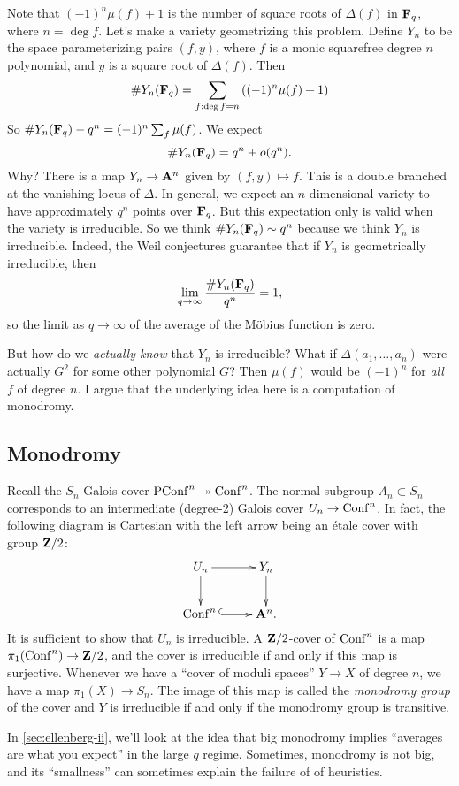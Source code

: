 Note that $(-1)^n\mu(f)+1$ is the number of square roots of $\Delta(f)$ in 
$\mathbf{F}_q$, where $n=\deg f$. Let's make a variety geometrizing this problem. 
Define $Y_n$ to be the space parameterizing pairs $(f,y)$, where $f$ is a monic 
squarefree degree $n$ polynomial, and $y$ is a square root of $\Delta(f)$. Then 
\[
  \#Y_n(\mathbf{F}_q) = \sum_{f:\deg f=n} \left((-1)^n \mu(f) + 1\right)
\]
So $\#Y_n(\mathbf{F}_q) - q^n = (-1)^n \sum_f \mu(f)$. We expect 
\[
  \# Y_n(\mathbf{F}_q) = q^n + o(q^n) .
\]
Why? There is a map $Y_n\to \mathbf{A}^n$ given by $(f,y)\mapsto f$. This is a 
double branched at the vanishing locus of $\Delta$. In general, we expect an 
$n$-dimensional variety to have approximately $q^n$ points over $\mathbf{F}_q$. But 
this expectation only is valid when the variety is irreducible. So we think 
$\# Y_n(\mathbf{F}_q)\sim q^n$ because we think $Y_n$ is irreducible. Indeed, the 
Weil conjectures guarantee that if $Y_n$ is geometrically irreducible, then 
\[
  \lim_{q\to \infty} \frac{\#Y_n(\mathbf{F}_q)}{q^n} = 1 ,
\]
so the limit as $q\to \infty$ of the average of the M\"obius function is zero. 

But how do we \emph{actually know} that $Y_n$ is irreducible? What if 
$\Delta(a_1,\dots,a_n)$ were actually $G^2$ for some other polynomial $G$? 
Then $\mu(f)$ would be $(-1)^n$ for \emph{all} $f$ of degree $n$. I argue that 
the underlying idea here is a computation of monodromy. 





\subsection{Monodromy}

Recall the $S_n$-Galois cover 
$\operatorname{PConf}^n \twoheadrightarrow \operatorname{Conf}^n$. The normal subgroup 
$A_n\subset S_n$ corresponds to an intermediate (degree-2) Galois cover 
$U_n\to \operatorname{Conf}^n$. In fact, the following diagram is Cartesian with 
the left arrow being an \'etale cover with group $\mathbf{Z}/2$:
\[\xymatrix{
  U_n \ar[r] \ar[d] 
    & Y_n \ar[d] \\
  \configuration^n{} \ar@{^{(}->}[r] 
    & \dA^n .
}\]
It is sufficient to show that $U_n$ is irreducible. A $\mathbf{Z}/2$-cover of 
$\operatorname{Conf}^n$ is a map $\pi_1(\operatorname{Conf}^n)\to \mathbf{Z}/2$, and the cover 
is irreducible if and only if this map is surjective. Whenever we have a 
``cover of moduli spaces'' $Y\to X$ of degree $n$, we have a map 
$\pi_1(X)\to S_n$. The image of this map is called the \emph{monodromy group} 
of the cover and $Y$ is irreducible if and only if the monodromy group is 
transitive. 

In \autoref{sec:ellenberg-ii}, we'll look at the idea that big monodromy 
implies ``averages are what you expect'' in the large $q$ regime. Sometimes, 
monodromy is not big, and its ``smallness'' can sometimes explain the failure 
of of heuristics. 




